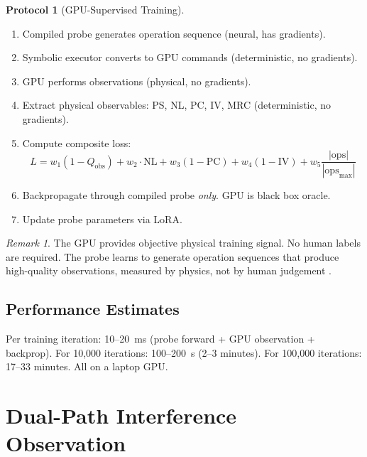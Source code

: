 \documentclass[11pt,twocolumn,a4paper]{article}
\theoremstyle{definition}
\newtheorem{protocol}[theorem]{Protocol}
\theoremstyle{remark}
\newtheorem{remark}[theorem]{Remark}
\begin{document}
\begin{protocol}[GPU-Supervised Training]
\label{prot:training}
\begin{enumerate}[nosep]
\item Compiled probe generates operation sequence (neural, has gradients).
\item Symbolic executor converts to GPU commands (deterministic, no gradients).
\item GPU performs observations (physical, no gradients).
\item Extract physical observables: PS, NL, PC, IV, MRC (deterministic, no gradients).
\item Compute composite loss:
\begin{equation}
L = w_1(1 - Q_{\mathrm{obs}}) + w_2 \cdot \mathrm{NL} + w_3(1 - \mathrm{PC}) + w_4(1 - \mathrm{IV}) + w_5 \frac{|\mathrm{ops}|}{|\mathrm{ops}_{\max}|}
\end{equation}
\item Backpropagate through compiled probe \emph{only}. GPU is black box oracle.
\item Update probe parameters via LoRA.
\end{enumerate}
\end{protocol}

\begin{remark}
The GPU provides objective physical training signal. No human labels are required. The probe learns to generate operation sequences that produce high-quality observations, measured by physics, not by human judgement \citep{gururangan2020, beltagy2019, brown2020}.
\end{remark}

\subsection{Performance Estimates}

Per training iteration: 10--20~ms (probe forward + GPU observation + backprop). For 10,000 iterations: 100--200~s (2--3 minutes). For 100,000 iterations: 17--33 minutes. All on a laptop GPU.

\section{Dual-Path Interference Observation}
\label{sec:dual_path}
\end{document}

